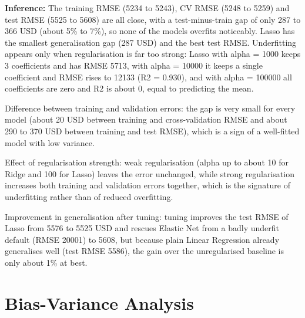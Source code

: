 \documentclass[11pt]{article}
\begin{document}
\textbf{Inference:} The training RMSE (5234 to 5243), CV RMSE (5248 to 5259) and test RMSE (5525 to 5608) are
all close, with a test-minus-train gap of only 287 to 366 USD (about 5\% to 7\%), so none of
the models overfits noticeably. Lasso has the smallest generalisation gap (287 USD) and the
best test RMSE. Underfitting appears only when regularisation is far too strong: Lasso with
alpha = 1000 keeps 3 coefficients and has RMSE 5713, with alpha = 10000 it keeps a single
coefficient and RMSE rises to 12133 (R2 = 0.930), and with alpha = 100000 all coefficients
are zero and R2 is about 0, equal to predicting the mean.

Difference between training and validation errors: the gap is very small for every model
(about 20 USD between training and cross-validation RMSE and about 290 to 370 USD between
training and test RMSE), which is a sign of a well-fitted model with low variance.

Effect of regularisation strength: weak regularisation (alpha up to about 10 for Ridge and
100 for Lasso) leaves the error unchanged, while strong regularisation increases both
training and validation errors together, which is the signature of underfitting rather than
of reduced overfitting.

Improvement in generalisation after tuning: tuning improves the test RMSE of Lasso from 5576
to 5525 USD and rescues Elastic Net from a badly underfit default (RMSE 20001) to 5608, but
because plain Linear Regression already generalises well (test RMSE 5586), the gain over the
unregularised baseline is only about 1\% at best.

\section*{Bias-Variance Analysis}
\label{sec:orgf18d56e}
\end{document}
